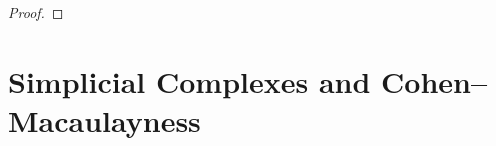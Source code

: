 \documentclass[10pt]{amsart}
\numberwithin{equation}{section}
\theoremstyle{definition}
\theoremstyle{remark}
\renewcommand{\L}{\mathcal{L}}%
\DeclareMathOperator{\In}{\mathrm{in}}
\newcommand{\1}{^{-1}}
\def\Q{\mathsf{Q}}
\begin{document}
\begin{proof}
\end{proof}

\section{Simplicial Complexes and Cohen--Macaulayness}\label{sect:combinatorics}
\end{document}
